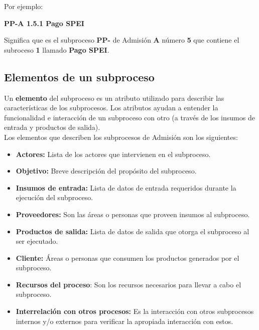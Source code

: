 \noindent Por ejemplo:
	\begin{center}
		{\bf PP-A 1.5.1 Pago SPEI}
	\end{center}

\noindent Significa que es el subproceso \textbf{PP-} de Admisión \textbf{A} número \textbf{5} que contiene el subroceso \textbf{1} llamado \textbf{Pago SPEI}.

\subsection{Elementos de un subproceso}

Un {\bf elemento} del subproceso es un atributo utilizado para describir las características de los subprocesos. Los atributos ayudan a entender la funcionalidad e interacción de un subproceso con otro (a través de los insumos de entrada y productos de salida).\\

\noindent Los elementos que describen los subprocesos de Admisión son los siguientes:

\begin{itemize}
	\item {\bf Actores:} Lista de los actores que intervienen en el subproceso.
	\item {\bf Objetivo:} Breve descripción del propósito del subproceso.
	\item {\bf Insumos de entrada:} Lista de datos de entrada requeridos durante la ejecución del subproceso.
	\item {\bf Proveedores:} Son las áreas o personas que proveen insumos al subproceso.
	\item {\bf Productos de salida:} Lista de datos de salida que otorga el subproceso al ser ejecutado.
	\item {\bf Cliente:} Áreas o personas que consumen los productos generados por el subproceso.
	\item {\bf Recursos del proceso}: Son los recursos necesarios para llevar a cabo el subproceso.
	\item {\bf Interrelación con otros procesos:} Es la interacción con otros subprocesos internos y/o externos para verificar la apropiada interacción con estos.
\end{itemize}
